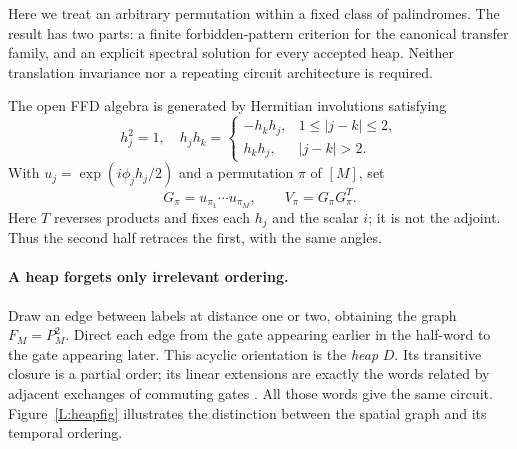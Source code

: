 \documentclass[10pt,letterpaper]{article}
\begin{document}
Here we treat an arbitrary permutation within a fixed class of palindromes. The result has two parts: a finite forbidden-pattern criterion for the canonical transfer family, and an explicit spectral solution for every accepted heap. Neither translation invariance nor a repeating circuit architecture is required.

The open FFD algebra is generated by Hermitian involutions satisfying
\begin{equation}\label{L:algebra}
 h_j^2=1,\quad
 h_jh_k=\begin{cases}-h_kh_j,&1\le |j-k|\le2,\\h_kh_j,&|j-k|>2.\end{cases}
\end{equation}
With $u_j=\exp(i\phi_jh_j/2)$ and a permutation $\pi$ of $[M]$, set
\begin{equation}\label{L:circuit}
 G_\pi=u_{\pi_1}\cdots u_{\pi_M},\qquad V_\pi=G_\pi G_\pi^T.
\end{equation}
Here $T$ reverses products and fixes each $h_j$ and the scalar $i$; it is not the adjoint. Thus the second half retraces the first, with the same angles.

\paragraph{A heap forgets only irrelevant ordering.}
Draw an edge between labels at distance one or two, obtaining the graph $F_M=P_M^2$. Direct each edge from the gate appearing earlier in the half-word to the gate appearing later. This acyclic orientation is the \emph{heap} $D$. Its transitive closure is a partial order; its linear extensions are exactly the words related by adjacent exchanges of commuting gates \cite{CartierFoata1969}. All those words give the same circuit. Figure~\ref{L:heapfig} illustrates the distinction between the spatial graph and its temporal ordering.
\end{document}
